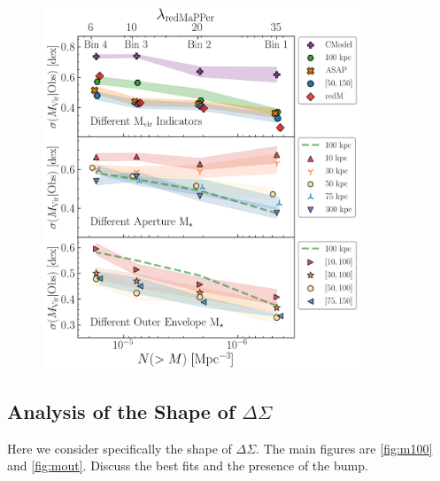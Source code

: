\documentclass[a4paper,fleqn,usenatbib]{mnras}
\begin{document}
  \begin{figure}
      \centering 
      \includegraphics[width=0.85\textwidth]{figure/topn_sigma_trend_sum}
      \caption{
          }
      \label{fig:scatter1}
  \end{figure}



\subsection{Analysis of the Shape of $\Delta\Sigma$}

Here we consider specifically the shape of $\Delta\Sigma$. The main figures are \ref{fig:m100} and \ref{fig:mout}. Discuss the best fits and the presence of the bump.
\end{document}
